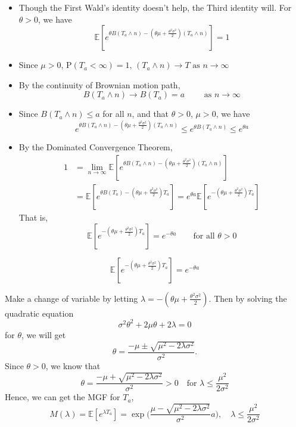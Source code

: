 \documentclass[letterpaper,handout]{beamer}
\def\p{\mathrm P}
\def\E{\mathbb E}
\begin{document}
\begin{frame}
\begin{itemize}
\item Though the First Wald's identity doesn't help, the Third identity will. For $\theta>0$, we have
$$\E[e^{\theta B(T_a\wedge n)-(\theta\mu+\frac{\theta^2\sigma^2}{2})(T_a\wedge n)}]=1$$
\item Since $\mu>0$, $\p(T_a<\infty)=1$, $(T_a\wedge n)\to T\mbox{ as }n\to\infty$
\item By the continuity of Brownian motion path, $$B(T_a\wedge n)\to B(T_a)=a\qquad\mbox{ as }n\to\infty$$
\item Since $B(T_a\wedge n)\le a$ for all $n$, and that $\theta >0$, $\mu>0$, we have
$$e^{\theta B(T_a\wedge n)-(\theta\mu+\frac{\theta^2\sigma^2}{2})(T_a\wedge n)}\le e^{\theta B(T_a\wedge n)}\le e^{\theta a}$$
\item By the Dominated Convergence Theorem,
\begin{align*}
1&=\lim_{n\to\infty}\E[e^{\theta B(T_a\wedge n)-(\theta\mu+\frac{\theta^2\sigma^2}{2})(T_a\wedge n)}]\\
&=\E[e^{\theta B(T_a)-(\theta\mu+\frac{\theta^2\sigma^2}{2})T_a}]
=e^{\theta a}\E[e^{-(\theta\mu+\frac{\theta^2\sigma^2}{2})T_a}]
\end{align*}
That is,
$$\E[e^{-(\theta\mu+\frac{\theta^2\sigma^2}{2})T_a}]=e^{-\theta a}\qquad\mbox{for all }\theta>0$$
\end{itemize}
\end{frame}
\begin{frame}
$$\E[e^{-(\theta\mu+\frac{\theta^2\sigma^2}{2})T_a}]=e^{-\theta a}$$

Make a change of variable by letting $\lambda = -(\theta\mu+\frac{\theta^2\sigma^2}{2})$.
Then by solving the quadratic equation
$$\sigma^2\theta^2 + 2\mu\theta +2\lambda=0$$
for $\theta$, we will get
$$\theta=\frac{-\mu\pm\sqrt{\mu^2-2\lambda\sigma^2}}{\sigma^2}.$$
Since $\theta>0$, we know that $$\theta=\frac{-\mu+\sqrt{\mu^2-2\lambda\sigma^2}}{\sigma^2}>0\quad\mbox{for }\lambda\le\frac{\mu^2}{2\sigma^2}$$
Hence, we can get the MGF for $T_a$,
$$
M(\lambda)=\E[e^{\lambda T_a}]=\exp\bigg(\frac{\mu-\sqrt{\mu^2-2\lambda\sigma^2}}{\sigma^2}a\bigg),\quad\lambda\le\frac{\mu^2}{2\sigma^2}
$$
\end{frame}
\end{document}
